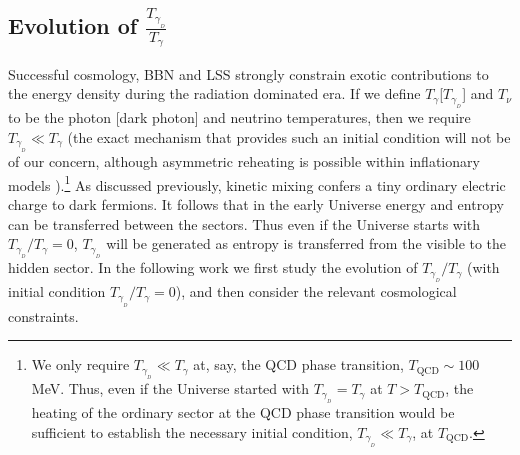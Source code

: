 \documentclass[12pt]{article}
\begin{document}
\vskip 0.3cm


\subsection{Evolution of $\frac{T _{\gamma _{_D}}}{T _{\gamma}}$}
\vskip 0.1cm

Successful cosmology, BBN and LSS strongly constrain exotic
contributions to the energy density during the radiation dominated era.
If we define $T _{\gamma}$[$T _{\gamma _{_D}}$] and $T _{\nu}$ to be the
photon [dark photon] and neutrino temperatures, then we require $T
_{\gamma _{_D}} \ll T _{\gamma}$ (the exact mechanism that provides such
an initial condition will not be of our concern, although asymmetric
reheating is possible within inflationary models
\cite{hodges}).\footnote{We only require $T _{\gamma _{_D}} \ll T
_{\gamma}$ at, say, the QCD phase transition, $T _{\text{QCD}} \sim 100$
MeV. Thus, even if the Universe started with $T _{\gamma _{_D}} = T
_{\gamma}$ at $T > T _{\text{QCD}}$, the heating of the ordinary sector
at the QCD phase transition would be sufficient to establish the
necessary initial condition, $T _{\gamma _{_D}} \ll T _{\gamma}$, at $T
_{\text{QCD}}$.} As discussed previously, kinetic mixing confers a tiny
ordinary electric charge to dark fermions. It follows that in the early
Universe energy and entropy can be transferred between the sectors. Thus
even if the Universe starts with $T _{\gamma _{_D}}/T _{\gamma}=0$, $T
_{\gamma _{_D}}$ will be generated as entropy is transferred from the
visible to the hidden sector. In the following work we first study the
evolution of $T _{\gamma _{_D}}/T _{\gamma}$ (with initial condition $T
_{\gamma _{_D}}/T _{\gamma} = 0$), and then consider the relevant
cosmological constraints.
\end{document}
